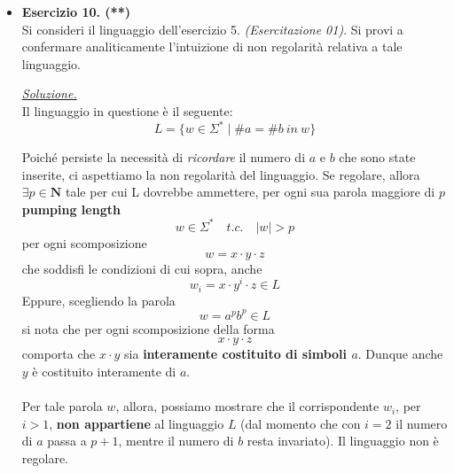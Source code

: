 \documentclass[a4paper,10pt]{article}
\newcommand{\EsercitazioneNum}{02}
\newcommand{\Data}{02/10/2025}
\begin{document}
{\begin{itemize}[label=, leftmargin=0pt]
        
    \vfill
    \noindent\makebox[\linewidth]{\rule{\linewidth}{0.4pt}}
    \newpage
    {\noindent
    \small \textbf{Computabilità, Complessità e Logica - a.a. 2025/26} \hfill \textbf{Esercitazione \EsercitazioneNum} \\[0.2cm]
    \scriptsize Matteo Liotta, \texttt{matteo.liotta@studenti.units.it} \hfill \Data \\[0.2cm]
    \noindent\makebox[\linewidth]{\rule{\linewidth}{0.4pt}} \\[0.3cm]}


    \begin{osservazioni}
        comporta che $x\cdot y$ sia \textbf{interamente costituito di simboli $a$}. Dunque anche $y$ è costituito interamente di $a$.\\\\
        Per tale parola $w$, allora, possiamo mostrare che il corrispondente $w_i$, per $i>1$, \textbf{non appartiene} al linguaggio $L$ (dal momento che con già con $i=2$ il numero di $a$ passa a $p$, con conseguente uguaglianza nel numero di $b$). Il linguaggio non è regolare. 
    \end{osservazioni}

    \item \textbf{Esercizio 10. (**)}\\ Si consideri il linguaggio dell'esercizio 5. \textit{(Esercitazione 01)}. Si provi a confermare analiticamente l'intuizione di non regolarità relativa a tale linguaggio. \\[0.1cm]

    \begin{osservazioni}
        \underline{\textit{Soluzione.}}\\
        Il linguaggio in questione è il seguente:
        $$   L = \{ w \in \Sigma^* \mid \#a = \#b\ in\ w\}$$

        Poiché persiste la necessità di \textit{ricordare} il numero di $a$ e $b$ che sono state inserite, ci aspettiamo la non regolarità del linguaggio. Se regolare, allora $\exists p\in \mathbf{N}$ tale per cui L dovrebbe ammettere, per ogni sua parola maggiore di $p$ \textbf{pumping length}$$w\in \Sigma^* \quad t.c.\quad |w|>p$$ per ogni scomposizione $$w=x\cdot y \cdot z$$ che soddisfi le condizioni di cui sopra, anche $$w_i=x\cdot y^i \cdot z \in L$$
        Eppure, scegliendo la parola $$w=a^{p}b^{p}\in L$$si nota che per ogni scomposizione della forma $$x\cdot y \cdot z$$ comporta che $x\cdot y$ sia \textbf{interamente costituito di simboli $a$}. Dunque anche $y$ è costituito interamente di $a$.\\\\
        Per tale parola $w$, allora, possiamo mostrare che il corrispondente $w_i$, per $i>1$, \textbf{non appartiene} al linguaggio $L$ (dal momento che con $i=2$ il numero di $a$ passa a $p+1$, mentre il numero di $b$ resta invariato). Il linguaggio non è regolare. 
        

\end{osservazioni}
\end{itemize}}
\end{document}
